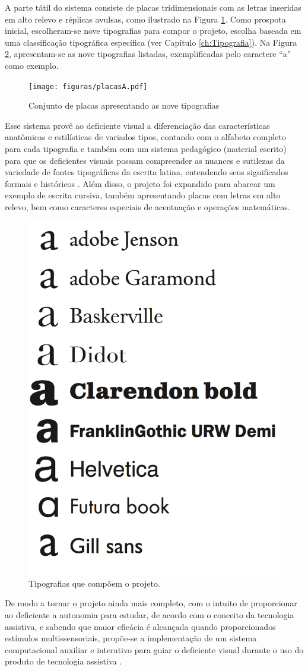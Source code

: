 A parte tátil do sistema consiste de placas tridimensionais com as letras inseridas em alto relevo e réplicas avulsas, como ilustrado na Figura \ref{fig:placas}. Como prospota inicial, escolheram-se nove tipografias para compor o projeto, escolha baseada em uma classificação tipográfica específica (ver Capítulo \ref{ch:Tipografia}). Na Figura \ref{fig:tipografias}, apresentam-se as nove tipografias listadas, exemplificadas pelo caractere ``a'' como exemplo.

\begin{figure}[H]
 \centering
  \texttt{[image: figuras/placasA.pdf]}
  \caption{Conjunto de placas apresentando as nove tipografias }
  \label{fig:placas}
\end{figure}

Esse sistema provê ao deficiente visual a diferenciação das características anatômicas e estilísticas de variados tipos, contando com o alfabeto completo para cada tipografia e também com um sistema pedagógico (material escrito) para que os deficientes visuais possam compreender as nuances e sutilezas da variedade de fontes tipográficas da escrita latina, entendendo seus significados formais e históricos  . Além disso, o projeto foi expandido para abarcar um exemplo de escrita cursiva, também apresentando placas com letras em alto relevo, bem como caracteres especiais de acentuação e operações matemáticas.

\begin{figure}[H]
 \centering
  \includegraphics[width=0.4\linewidth]{figuras/tipografias.pdf}
  \caption{Tipografias que compõem o projeto.}
  \label{fig:tipografias}
\end{figure}


De modo a tornar o projeto ainda mais completo, com o intuito de proporcionar ao deficiente a autonomia para estudar, de acordo com o conceito da tecnologia assistiva, e sabendo que maior eficácia é alcançada quando proporcionados estímulos multissensoriais, propõe-se a implementação de um sistema computacional auxiliar e interativo para guiar o deficiente visual durante o uso do produto de tecnologia assistiva .


